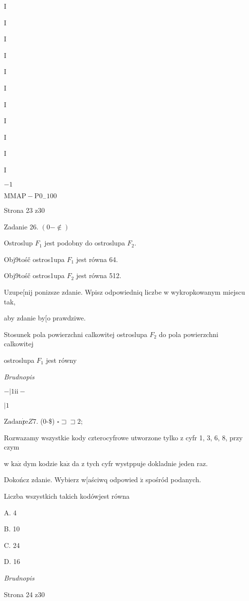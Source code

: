 \documentclass[a4paper,12pt]{article}
\begin{document}
I

I

I

I

I

I

I

I

I

I

I

$-1$

$\mathrm{M}\mathrm{M}\mathrm{A}\mathrm{P}-\mathrm{P}0_{-}100$

Strona 23 z30





Zadanie 26. $(0-\not\in)$

Ostroslup $F_{1}$ jest podobny do ostroslupa $F_{2}.$

Obj9tośč ostros1upa $F_{1}$ jest równa 64.

Obj9tośč ostros1upa $F_{2}$ jest równa 512.

Uzupe[nij ponizsze zdanie. Wpisz odpowiedniq liczbe w wykropkowanym miejscu tak,

aby zdanie by[o prawdziwe.

Stosunek pola powierzchni calkowitej ostroslupa $F_{2}$ do pola powierzchni calkowitej

ostroslupa $F_{1}$ jest równy

{\it Brudnopis}

$-|1\mathrm{i}\mathrm{i}-$

$| 1$

$\mathrm{Z}\mathrm{a}\mathrm{d}\mathrm{a}\mathrm{n}\dot{\mathfrak{x}}\mathrm{e}Z7$. (0-{\$}) $\square \sqsupset\sqsupset 2$;

Rozwazamy wszystkie kody czterocyfrowe utworzone tylko z cyfr 1, 3, 6, 8, przy czym

w $\mathrm{k}\mathrm{a}\dot{\mathrm{z}}$ dym kodzie $\mathrm{k}\mathrm{a}\dot{\mathrm{z}}$ da z tych cyfr wystppuje dokladnie jeden raz.

Dokończ zdanie. Wybierz w[aściwq odpowied $\acute{\mathrm{z}}$ spośród podanych.

Liczba wszystkich takich kodówjest równa

A. 4

B. 10

C. 24

D. 16

{\it Brudnopis}

Strona 24 z30
\end{document}
